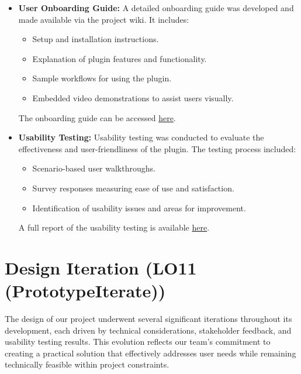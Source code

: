 \documentclass{article}
\begin{document}
\begin{itemize}
    \item \textbf{User Onboarding Guide:}  
    A detailed onboarding guide was developed and made available via the project wiki. It includes:
    \begin{itemize}
        \item Setup and installation instructions.
        \item Explanation of plugin features and functionality.
        \item Sample workflows for using the plugin.
        \item Embedded video demonstrations to assist users visually.
    \end{itemize}
    The onboarding guide can be accessed \href{https://github.com/ssm-lab/capstone--sco-vs-code-plugin/wiki}{here}.


    \item \textbf{Usability Testing:}  
    Usability testing was conducted to evaluate the effectiveness and user-friendliness of the plugin. The testing process included:
    \begin{itemize}
        \item Scenario-based user walkthroughs.
        \item Survey responses measuring ease of use and satisfaction.
        \item Identification of usability issues and areas for improvement.
    \end{itemize}
        A full report of the usability testing is available \href{https://github.com/ssm-lab/capstone--source-code-optimizer/blob/main/docs/Extras/UsabilityTesting/UsabilityTestingReport.pdf}{here}.

\end{itemize}
\section{Design Iteration (LO11 (PrototypeIterate))}



The design of our project underwent several significant iterations throughout its development, each driven by technical considerations, stakeholder feedback, and usability testing results. This evolution reflects our team's commitment to creating a practical solution that effectively addresses user needs while remaining technically feasible within project constraints.\\
\end{document}
